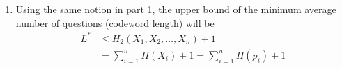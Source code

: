 \begin{exercise}
\begin{solution}
\begin{enumerate}
{    }
    \item { Using the same notion in part 1, the upper bound of the minimum average number of questions (codeword length) will be
    \begin{equation}
      \begin{aligned}
        L^* &\le H_2 (X_1,X_2,\ldots,X_n) + 1 \\
        &= \sum_{i=1}^{n} H(X_i) + 1 = \sum_{i=1}^{n} H(p_i) + 1
      \end{aligned}
    \end{equation}

    }
  \end{enumerate}
  \end{solution}
  \label{ex5-6}
\end{exercise}

